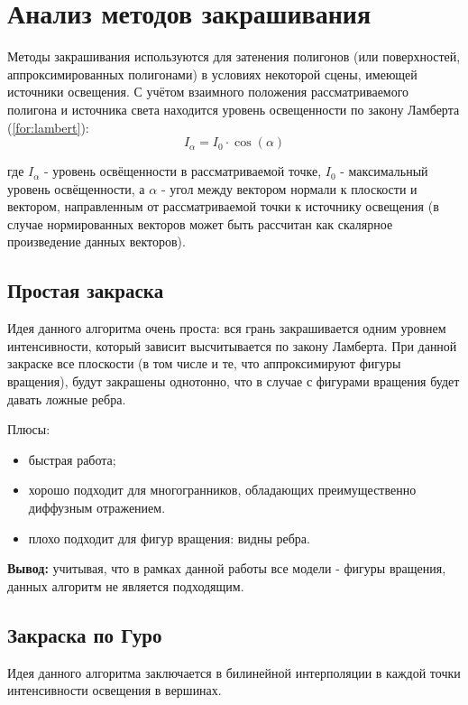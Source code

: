 \section{Анализ методов закрашивания}

Методы закрашивания используются для затенения полигонов (или поверхностей, аппроксимированных полигонами) в условиях некоторой сцены, имеющей источники освещения. С учётом взаимного положения рассматриваемого полигона и источника света находится уровень освещенности по закону Ламберта (\ref{for:lambert}):
\begin{equation}
    \label{for:lambert}
    I_{\alpha} = I_0 \cdot \cos{(\alpha)}
\end{equation}

где $I_{\alpha}$ - уровень освёщенности в рассматриваемой точке, $I_0$ - максимальный уровень освёщенности, а $\alpha$ - угол между вектором нормали к плоскости и вектором, направленным от рассматриваемой точки к источнику освещения (в случае нормированных векторов может быть рассчитан как скалярное произведение данных векторов).

\subsection{Простая закраска}
Идея данного алгоритма очень проста: вся грань закрашивается одним уровнем интенсивности, который зависит высчитывается по закону Ламберта. При данной закраске все плоскости (в том числе и те, что аппроксимируют фигуры вращения), будут закрашены однотонно, что в случае с фигурами вращения будет давать ложные ребра.

Плюсы:
\begin{itemize}
    \item быстрая работа;
    \item хорошо подходит для многогранников, обладающих преимущественно диффузным отражением.
\end{itemize}

\begin{itemize}
    \item плохо подходит для фигур вращения: видны ребра.
\end{itemize}

\textbf{Вывод:} учитывая, что в рамках данной работы все модели - фигуры вращения, данных алгоритм не является подходящим.

\subsection{Закраска по Гуро}
Идея данного алгоритма заключается в билинейной интерполяции в каждой точки интенсивности освещения в вершинах.

